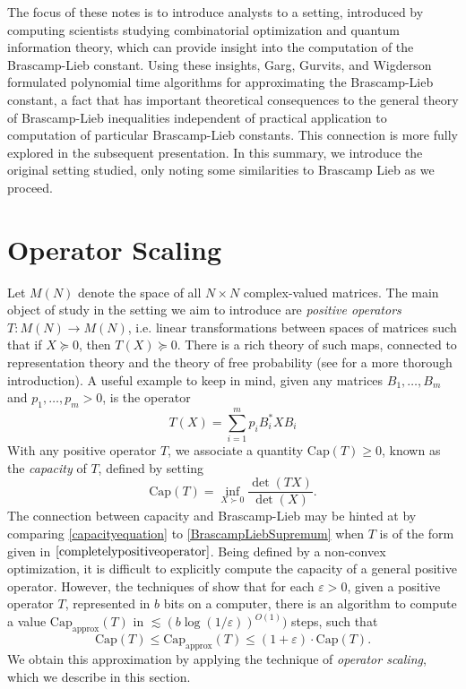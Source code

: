 \documentclass[12pt]{article}
\begin{document}
The focus of these notes is to introduce analysts to a setting, introduced by computing scientists studying combinatorial optimization and quantum information theory, which can provide insight into the computation of the Brascamp-Lieb constant. Using these insights, Garg, Gurvits, and Wigderson \cite{ggow} formulated polynomial time algorithms for approximating the Brascamp-Lieb constant, a fact that has important theoretical consequences to the general theory of Brascamp-Lieb inequalities independent of practical application to computation of particular Brascamp-Lieb constants. This connection is more fully explored in the subsequent presentation. In this summary, we introduce the original setting studied, only noting some similarities to Brascamp Lieb as we proceed.

\section{Operator Scaling}

Let $M(N)$ denote the space of all $N \times N$ complex-valued matrices. The main object of study in the setting we aim to introduce are \emph{positive operators} $T: M(N) \to M(N)$, i.e. linear transformations between spaces of matrices such that if $X \succeq 0$, then $T(X) \succeq 0$.  There is a rich theory of such maps, connected to representation theory and the theory of free probability (see \cite{bhatia} for a more thorough introduction). A useful example to keep in mind, given any matrices $B_1,\dots, B_m$ and $p_1,\dots,p_m > 0$, is the operator
%
\begin{equation} \label{completelypositiveoperator}
    T(X) = \sum_{i = 1}^m p_i B_i^* X B_i
\end{equation}
%
With any positive operator $T$, we associate a quantity $\text{Cap}(T) \geq 0$, known as the \emph{capacity} of $T$, defined by setting
%
\begin{equation} \label{capacityequation}
    \text{Cap}(T) = \inf_{X \succ 0} \frac{\det(TX)}{\det(X)}.
\end{equation}
%
The connection between capacity and Brascamp-Lieb may be hinted at by comparing \eqref{capacityequation} to \eqref{BrascampLiebSupremum} when $T$ is of the form given in $\eqref{completelypositiveoperator}$. Being defined by a non-convex optimization, it is difficult to explicitly compute the capacity of a general positive operator. However, the techniques of \cite{gurv2004} show that for each $\varepsilon > 0$, given a positive operator $T$, represented in $b$ bits on a computer, there is an algorithm to compute a value $\text{Cap}_{\text{approx}}(T)$ in $\lesssim (b \log(1/\varepsilon))^{O(1)})$ steps, such that
%
\[ \text{Cap}(T) \leq \text{Cap}_{\text{approx}}(T) \leq (1 + \varepsilon) \cdot \text{Cap}(T). \]
%
We obtain this approximation by applying the technique of \emph{operator scaling}, which we describe in this section.
\end{document}
